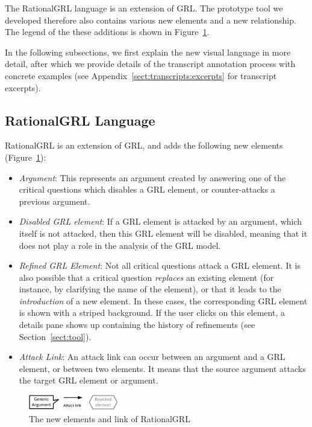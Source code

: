 The RationalGRL language is an extension of GRL. The prototype tool we developed therefore also contains various new elements and a new relationship. The legend of the these additions is shown in Figure~\ref{fig:rationalgrllegend}.

In the following subsections, we first explain the new visual language in more detail, after which we provide details of the transcript annotation process with concrete examples (see Appendix~\ref{sect:transcripts:excerpts} for transcript excerpts).

\subsection{RationalGRL Language}

RationalGRL is an extension of GRL, and adds the following new elements (Figure~\ref{fig:rationalgrllegend}):
\begin{itemize}
\item \emph{Argument}: This represents an argument created by answering one of the critical questions which disables a GRL element, or counter-attacks a previous argument.
\item \emph{Disabled GRL element}: If a GRL element is attacked by an argument, which itself is not attacked, then this GRL element will be disabled, meaning that it does not play a role in the analysis of the GRL model. 
\item \emph{Refined GRL Element}: Not all critical questions attack a GRL element. It is also possible that a critical question \emph{replaces} an existing element (for instance, by clarifying the name of the element), or that it leads to the \emph{introduction} of a new element. In these cases, the corresponding GRL element is shown with a striped background. If the user clicks on this element, a details pane shows up containing the history of refinements (see Section~\ref{sect:tool}).
\item \emph{Attack Link}: An attack link can occur between an argument and a GRL element, or between two elements. It means that the source argument attacks the target GRL element or argument.
\end{itemize}

\begin{figure}[h]
\centering
\includegraphics[width=0.35\textwidth]{img/legend}
\caption{The new elements and link of RationalGRL}
\label{fig:rationalgrllegend}
\end{figure}

